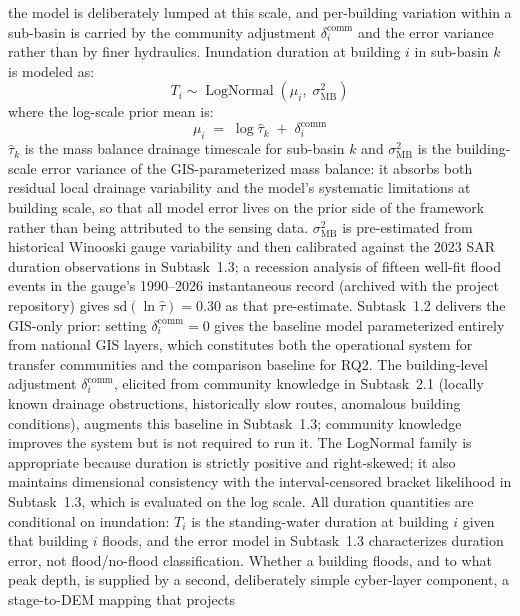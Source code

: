 \documentclass[11pt]{article}
\begin{document}
the model is deliberately lumped at this scale, and per-building variation within a
sub-basin is carried by the community adjustment $\delta_i^{\mathrm{comm}}$ and the
error variance rather than by finer hydraulics.
Inundation duration at building $i$ in sub-basin $k$ is modeled as:
\begin{equation}\label{eq:prior}
  T_i \sim \operatorname{LogNormal}(\mu_i,\; \sigma_{\mathrm{MB}}^2)
\end{equation}
where the log-scale prior mean is:
\begin{equation}\label{eq:mu}
  \mu_i \;=\; \log \hat{\tau}_k \;+\; \delta_i^{\mathrm{comm}}
\end{equation}
$\hat{\tau}_k$ is the mass balance drainage timescale for sub-basin $k$ and
$\sigma_{\mathrm{MB}}^2$ is the building-scale error variance of the
GIS-parameterized mass balance: it absorbs both residual local drainage
variability and the model's systematic limitations at building scale, so that
all model error lives on the prior side of the framework rather than being
attributed to the sensing data.
$\sigma_{\mathrm{MB}}^2$ is pre-estimated from historical Winooski gauge
variability and then calibrated against the 2023 SAR duration observations in
Subtask~1.3; a recession analysis of fifteen well-fit flood events in the
gauge's 1990--2026 instantaneous record (archived with the project repository)
gives $\mathrm{sd}(\ln \hat{\tau}) = 0.30$ as that pre-estimate.
Subtask~1.2 delivers the GIS-only prior: setting $\delta_i^{\mathrm{comm}} = 0$
gives the baseline model parameterized entirely from national GIS layers, which
constitutes both the operational system for transfer communities and the comparison
baseline for RQ2.
The building-level adjustment $\delta_i^{\mathrm{comm}}$, elicited from community
knowledge in Subtask~2.1 (locally known drainage obstructions, historically slow
routes, anomalous building conditions), augments this baseline in Subtask~1.3;
community knowledge improves the system but is not required to run it.
The LogNormal family is appropriate because duration is strictly positive and
right-skewed; it also maintains dimensional consistency with the interval-censored
bracket likelihood in Subtask~1.3, which is evaluated on the log scale.
All duration quantities are conditional on inundation: $T_i$ is the standing-water
duration at building $i$ given that building $i$ floods, and the error model in
Subtask~1.3 characterizes duration error, not flood/no-flood classification.
Whether a building floods, and to what peak depth, is supplied by a second,
deliberately simple cyber-layer component, a stage-to-DEM mapping that projects
\end{document}
